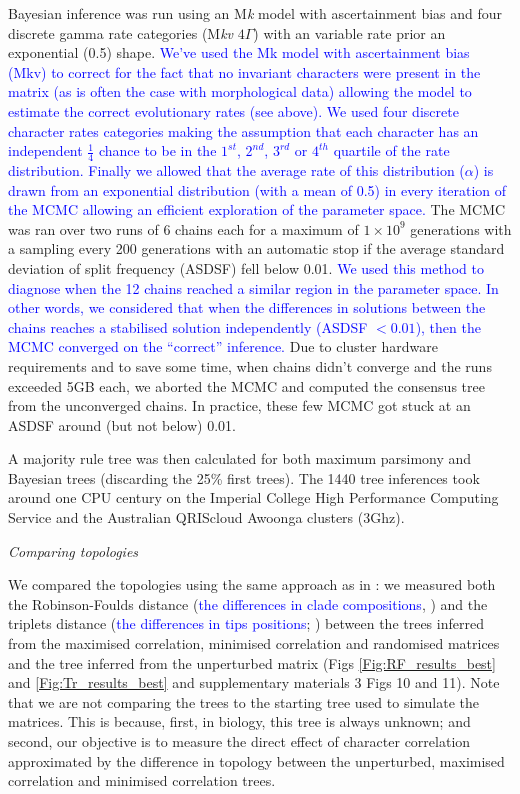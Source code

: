 \documentclass[12pt,letterpaper]{article}
\renewcommand{\subsection}[1]{%
\bigskip
\begin{center}
\begin{large}
\normalfont\itshape #1
\end{large}
\end{center}}
\begin{document}
Bayesian inference was run using an M\textit{k} model with ascertainment bias and four discrete gamma rate categories (M\textit{kv} $4\Gamma$) with an variable rate prior an exponential (0.5) shape.
\textcolor{blue}{We’ve used the Mk model with ascertainment bias (Mkv) to correct for the fact that no invariant characters were present in the matrix (as is often the case with morphological data) allowing the model to estimate the correct evolutionary rates (see above).
We used four discrete character rates categories making the assumption that each character has an independent $\frac{1}{4}$ chance to be in the $1^{st}$, $2^{nd}$, $3^{rd}$ or $4^{th}$ quartile of the rate distribution.
Finally we allowed that the average rate of this distribution ($\alpha$) is drawn from an exponential distribution (with a mean of 0.5) in every iteration of the MCMC allowing an efficient exploration of the parameter space.}
The MCMC was ran over two runs of 6 chains each for a maximum of $1\times10^9$ generations with a sampling every 200 generations with an automatic stop if the average standard deviation of split frequency (ASDSF) fell below 0.01.
\textcolor{blue}{We used this method to diagnose when the 12 chains reached a similar region in the parameter space. In other words, we considered that when the differences in solutions between the chains reaches a stabilised solution independently (ASDSF $<0.01$), then the MCMC converged on the ``correct'' inference.}
Due to cluster hardware requirements and to save some time, when chains didn't converge and the runs exceeded 5GB each, we aborted the MCMC and computed the consensus tree from the unconverged chains.
In practice, these few MCMC got stuck at an ASDSF around (but not below) 0.01.

A majority rule tree was then calculated for both maximum parsimony and Bayesian trees (discarding the 25\% first trees).
The 1440 tree inferences took around one CPU century on the Imperial College High Performance Computing Service \citep[2-3GHz clock rate;][]{HPC} and the Australian QRIScloud Awoonga clusters (3Ghz).

\subsection{Comparing topologies}
We compared the topologies using the same approach as in \cite{Guillerme2016146}: we measured both the Robinson-Foulds distance (\textcolor{blue}{the differences in clade compositions}, \citealt{RF1981}) and the triplets distance (\textcolor{blue}{the differences in tips positions}; \citealt{dobson1975triplets}) between the trees inferred from the maximised correlation, minimised correlation and randomised matrices and the tree inferred from the unperturbed matrix (Figs \ref{Fig:RF_results_best} and \ref{Fig:Tr_results_best} and supplementary materials 3 Figs 10 and 11).
Note that we are not comparing the trees to the starting tree used to simulate the matrices.
This is because, first, in biology, this tree is always unknown; and second, our objective is to measure the direct effect of character correlation approximated by the difference in topology between the unperturbed,  maximised correlation and minimised correlation trees.
\end{document}
